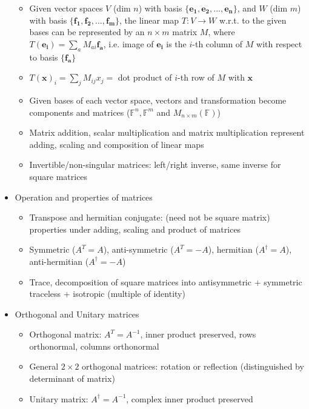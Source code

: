 \begin{itemize}
            \begin{itemize}
                  \item Given vector spaces $V$ (dim $n$) with basis $\{\mathbf{e_{1}},\mathbf{e_{2}},...,\mathbf{e_{n}}\}$,
                        and $W$ (dim $m$) with basis $\{\mathbf{f_{1}},\mathbf{f_{2}},...,\mathbf{f_{m}}\}$,
                        the linear map $T:V\to W$ w.r.t. to the given bases can be represented
                        by an $n\times m$ matrix $M$, where $T(\mathbf{e_{i}})=\sum_{a}M_{ai}\mathbf{f_{a}}$,
                        i.e. image of $\mathbf{e_{i}}$ is the $i$-th column of $M$ with
                        respect to basis $\{\mathbf{f_{a}}\}$
                  \item $T(\mathbf{x})_{i}=\sum_{j}M_{ij}x_{j}=$ dot product of $i$-th row
                        of $M$ with $\mathbf{x}$
                  \item Given bases of each vector space, vectors and transformation become
                        components and matrices ($\mathbb{F}^{n},\mathbb{F}^{m}$ and $M_{n\times m}(\mathbb{F})$)
                  \item Matrix addition, scalar multiplication and matrix multiplication represent
                        adding, scaling and composition of linear maps
                  \item Invertible/non-singular matrices: left/right inverse, same inverse
                        for square matrices
            \end{itemize}
      \item Operation and properties of matrices
            \begin{itemize}
                  \item Transpose and hermitian conjugate: (need not be square matrix) properties
                        under adding, scaling and product of matrices
                  \item Symmetric ($A^{T}=A$), anti-symmetric ($A^{T}=-A$), hermitian ($A^{\dagger}=A$),
                        anti-hermitian ($A^{\dagger}=-A$)
                  \item Trace, decomposition of square matrices into antisymmetric + symmetric
                        traceless + isotropic (multiple of identity)
            \end{itemize}
      \item Orthogonal and Unitary matrices
            \begin{itemize}
                  \item Orthogonal matrix: $A^{T}=A^{-1}$, inner product preserved, rows
                        orthonormal, columns orthonormal
                  \item General $2\times2$ orthogonal matrices: rotation or reflection (distinguished
                        by determinant of matrix)
                  \item Unitary matrix: $A^{\dagger}=A^{-1}$, complex inner product preserved
            \end{itemize}
\end{itemize}

